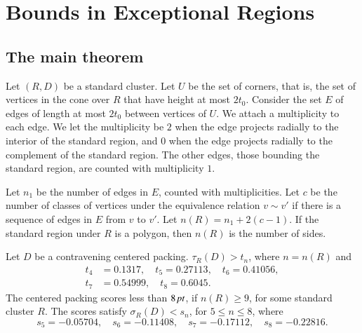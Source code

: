 

\chapter{Bounds in Exceptional Regions}%
    \label{sec:BER}






\section{The main theorem} %
    \label{sec:the-main-theorem}

Let $(R,D)$ be a standard cluster. Let $U$ be the set of corners,
that is, the set of vertices in the cone over $R$ that have height
at most $2t_0$.  Consider the set $E$ of edges of length at most
$2t_0$ between vertices of $U$. We attach a multiplicity to each
edge. We let the multiplicity be $2$ when the edge projects
radially to the interior of the standard region, and $0$ when the
edge projects radially to the complement of the standard region.
The other edges, those bounding the standard region, are counted
with multiplicity $1$.

Let $n_1$ be the number of edges in $E$, counted with multiplicities.
Let $c$ be the number of classes of vertices under the equivalence
relation $v\sim v'$ if there is a sequence of edges in $E$ from $v$ to
$v'$. Let $n(R)=n_1+2(c-1)$. If the standard region under $R$ is a
polygon, then $n(R)$ is the number of sides.

\begin{theorem}
    \label{thm:the-main-theorem}
    Let $D$ be a contravening centered packing.
$\tau_R(D) > t_n$, where $n=n(R)$ and
    $$
    \begin{array}{lll}
    t_4&=0.1317,\quad t_5=0.27113,\quad
    t_6=0.41056,\\
    t_7&=0.54999,\quad t_8=0.6045.
    \end{array}
    $$
The centered packing scores less than $8\,\hbox{\it pt}$, if $n(R)\ge 9$,
for some standard cluster $R$. The scores satisfy
$\sigma_R(D)<s_n$, for $5\le n\le 8$, where
    $$
    s_5=-0.05704,\quad s_6=-0.11408,\quad
    s_7=-0.17112,\quad s_8=-0.22816.
    $$
\end{theorem}

